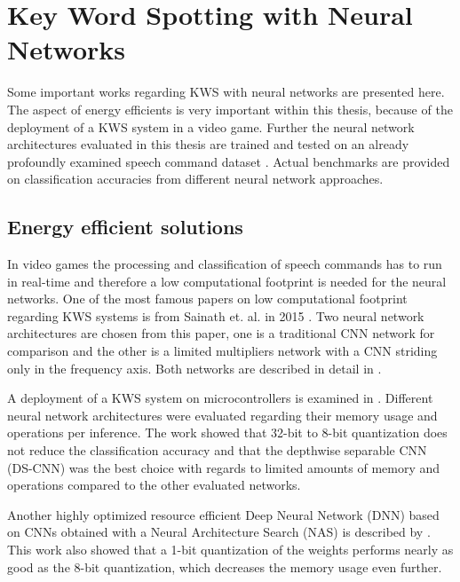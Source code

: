 
\section{Key Word Spotting with Neural Networks}\label{sec:prev_kws}
\thesisStateRevised
Some important works regarding KWS with neural networks are presented here. 
The aspect of energy efficients is very important within this thesis, because of the deployment of a KWS system in a video game.
Further the neural network architectures evaluated in this thesis are trained and tested on an already profoundly examined speech command dataset \cite{Warden2018}.
Actual benchmarks are provided on classification accuracies from different neural network approaches.



\subsection{Energy efficient solutions}
In video games the processing and classification of speech commands has to run in real-time and therefore a low computational footprint is needed for the neural networks.
One of the most famous papers on low computational footprint regarding KWS systems is from Sainath et. al. in 2015 \cite{Sainath2015}.
Two neural network architectures are chosen from this paper, one is a traditional CNN network for comparison and the other is a limited multipliers network with a CNN striding only in the frequency axis.
Both networks are described in detail in .

A deployment of a KWS system on microcontrollers is examined in \cite{Zhang2017}.
Different neural network architectures were evaluated regarding their memory usage and operations per inference.
The work showed that 32-bit to 8-bit quantization does not reduce the classification accuracy and that the depthwise separable CNN (DS-CNN) was the best choice with regards to limited amounts of memory and operations compared to the other evaluated networks.

Another highly optimized resource efficient Deep Neural Network (DNN) based on CNNs obtained with a Neural Architecture Search (NAS) is described by \cite{Peter2020}.
This work also showed that a 1-bit quantization of the weights performs nearly as good as the 8-bit quantization, which decreases the memory usage even further.



